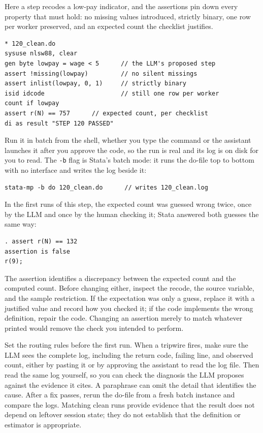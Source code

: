 Here a step recodes a low-pay indicator, and the assertions pin down every property that must hold: no missing values introduced, strictly binary, one row per worker preserved, and an expected count the checklist justifies.
\par
{\footnotesize
\begin{verbatim}
* 120_clean.do
sysuse nlsw88, clear
gen byte lowpay = wage < 5      // the LLM's proposed step
assert !missing(lowpay)         // no silent missings
assert inlist(lowpay, 0, 1)     // strictly binary
isid idcode                     // still one row per worker
count if lowpay
assert r(N) == 757      // expected count, per checklist
di as result "STEP 120 PASSED"
\end{verbatim}
}
Run it in batch from the shell, whether you type the command or the assistant launches it after you approve the code, so the run is real and its log is on disk for you to read. The \texttt{-b} flag is Stata's batch mode: it runs the do-file top to bottom with no interface and writes the log beside it:
\par
{\footnotesize
\begin{verbatim}
stata-mp -b do 120_clean.do      // writes 120_clean.log
\end{verbatim}
}
In the first runs of this step, the expected count was guessed wrong twice, once by the LLM and once by the human checking it; Stata answered both guesses the same way:
\par
{\footnotesize
\begin{verbatim}
. assert r(N) == 132
assertion is false
r(9);
\end{verbatim}
}
The assertion identifies a discrepancy between the expected count and the computed count. Before changing either, inspect the recode, the source variable, and the sample restriction. If the expectation was only a guess, replace it with a justified value and record how you checked it; if the code implements the wrong definition, repair the code. Changing an assertion merely to match whatever printed would remove the check you intended to perform.

Set the routing rules before the first run. When a tripwire fires, make sure the LLM sees the complete log, including the return code, failing line, and observed count, either by pasting it or by approving the assistant to read the log file. Then read the same log yourself, so you can check the diagnosis the LLM proposes against the evidence it cites. A paraphrase can omit the detail that identifies the cause. After a fix passes, rerun the do-file from a fresh batch instance and compare the logs. Matching clean runs provide evidence that the result does not depend on leftover session state; they do not establish that the definition or estimator is appropriate.

